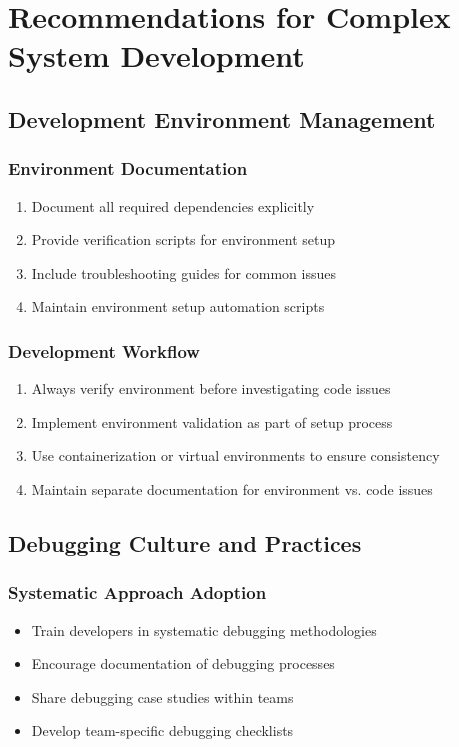 \documentclass[11pt,a4paper]{article}
\begin{document}
\section{Recommendations for Complex System Development}

\subsection{Development Environment Management}

\subsubsection{Environment Documentation}

\begin{enumerate}
\item Document all required dependencies explicitly
\item Provide verification scripts for environment setup
\item Include troubleshooting guides for common issues
\item Maintain environment setup automation scripts
\end{enumerate}

\subsubsection{Development Workflow}

\begin{enumerate}
\item Always verify environment before investigating code issues
\item Implement environment validation as part of setup process
\item Use containerization or virtual environments to ensure consistency
\item Maintain separate documentation for environment vs. code issues
\end{enumerate}

\subsection{Debugging Culture and Practices}

\subsubsection{Systematic Approach Adoption}

\begin{itemize}
\item Train developers in systematic debugging methodologies
\item Encourage documentation of debugging processes
\item Share debugging case studies within teams
\item Develop team-specific debugging checklists
\end{itemize}
\end{document}
